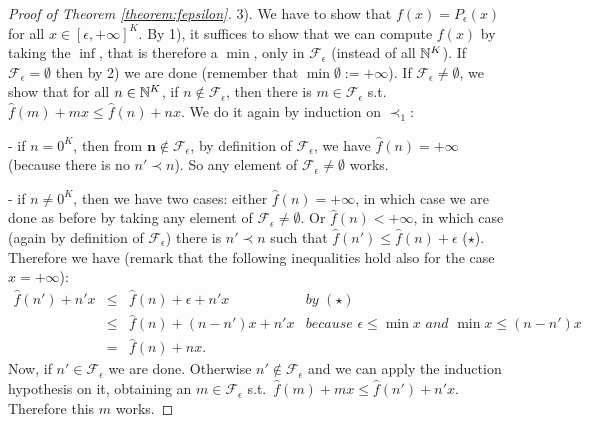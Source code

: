 \begin{proof}[Proof of Theorem \ref{theorem:fepsilon}]
3).
We have to show that $f( x )=P_\epsilon( x )$ for all $ x \in [\epsilon,+\infty]^{K}$.
By 1), it suffices to show that we can compute $f( x )$ by taking the $\inf$, that is therefore a $\min$, only in $\mathcal F_\epsilon$ (instead of all $\mathbb{N}^{K}$).
If $\mathcal F_\epsilon=\emptyset$ then by 2) we are done (remember that $\min\emptyset := +\infty$).
If $\mathcal F_\epsilon\neq\emptyset$, we show that for all $ n  \in\mathbb{N}^{K}$, if $ n   \notin\mathcal F_\epsilon$, then there is $ m  \in\mathcal F_\epsilon$ s.t.\ $\hat f( m  )+ m   x  \leq \hat f( n  )+ n   x $.
We do it again by induction on $\prec_{1}$:

- if $ n  =0^{K}$, then from $\mathbf  n\notin \mathcal F_{\epsilon}$, by definition of $\mathcal F_\epsilon$, we have $\hat f( n  )=+\infty$ (because there is no $ n  '\prec n  $).
So any element of $\mathcal F_\epsilon\neq\emptyset$ works.

- if $ n  \neq 0^{K}$, then we have two cases:
either $\hat f( n  )=+\infty$, in which case we are done as before by taking any element of $\mathcal F_\epsilon\neq\emptyset$.
Or $\hat f( n  )<+\infty$, in which case (again by definition of $\mathcal F_\epsilon$) there is $ n  '\prec n  $ such that $ \hat f( n  ')\leq \hat f( n  )+\epsilon$  ($\star$).
Therefore we have (remark that the following inequalities hold also for the case $x=+\infty$):
\[\begin{array}{rclr}
 \hat f( n  ')+ n  ' x  & \leq & \hat f( n  ) + \epsilon +  n' x  & \textit{by }(\star) \\
 & \leq & \hat f( n  ) + ( n  - n  ') x  +  n  ' x  & \textit{because $\epsilon\leq\min x $ and $\min  x \leq( n  -  n') x $} \\
 & = & \hat f( n  )+  n   x . &
\end{array}\]
Now, if $ n  '\in\mathcal F_\epsilon$ we are done.
Otherwise $ n  '\notin\mathcal F_\epsilon$ and we can apply the induction hypothesis on it, obtaining an $ m  \in\mathcal F_\epsilon$ s.t.\ $\hat f( m  )+ m   x  \leq \hat f( n  ')+ n  ' x $.
Therefore this $ m  $ works.
\end{proof}





%

